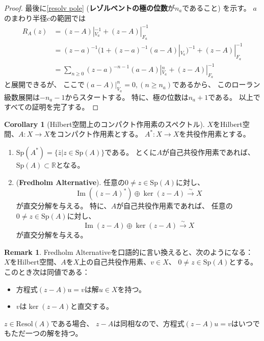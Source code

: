\documentclass[uplatex]{jsarticle}
\theoremstyle{definition}
\newtheorem{cor}[cor]{Corollary}
\newtheorem{rem}[rem]{Remark}
\DeclareMathOperator{\im}{\mathrm{Im}}
\newcommand{\R}{\mathbb{R}}
\newcommand{\resol}{\mathrm{Resol}}
\newcommand{\spectm}{\mathrm{Sp}}
\begin{document}
\begin{proof}
  最後に\ref{resolv pole}
  (\textbf{レゾルベントの極の位数}が\(n_a\)であること) を示す。
  \(a\)のまわり半径\(c\)の範囲では
  \begin{align*}
    R_A(z) &= (z-A)|_{V_a}^{-1} + (z-A)|_{F_a}^{-1} \\
    &= (z-a)^{-1}(1+(z-a)^{-1}(a-A)|_{V_a})^{-1} + (z-A)|_{F_a}^{-1} \\
    &= \sum_{n\geq 0}(z-a)^{-n-1}(a-A)|_{V_a}^n + (z-A)|_{F_a}^{-1}
  \end{align*}
  と展開できるが、
  ここで\((a-A)|_{V_a}^n = 0, (n\geq n_a)\)であるから、
  このローラン級数展開は\(-n_a-1\)からスタートする。
  特に、極の位数は\(n_a+1\)である。
  以上ですべての証明を完了する。
\end{proof}



\begin{cor}[Hilbert空間上のコンパクト作用素のスペクトル]
  \label{Hilb cpt spectm}
  \(X\)をHilbert空間、\(A:X\to X\)をコンパクト作用素とする。
  \(A^*:X\to X\)を共役作用素とする。
  \begin{enumerate}
    \item \label{conj spectm}
    \(\spectm(A^*) = \{ \bar{z} | z\in \spectm(A)\}\)である。
    とくに\(A\)が自己共役作用素であれば、
    \(\spectm(A)\subset \R\)となる。
    \item \label{Fredholm alt}
    (\textbf{Fredholm Alternative}).
    任意の\(0\neq z\in \spectm(A)\)に対し、
    \[\im((z-A)^*)\oplus \ker(z-A)\xrightarrow{\sim} X\]
    が直交分解を与える。
    特に、\(A\)が自己共役作用素であれば、
    任意の\(0\neq z\in \spectm(A)\)に対し、
    \[\im(z-A)\oplus \ker(z-A)\xrightarrow{\sim} X\]
    が直交分解を与える。
  \end{enumerate}
\end{cor}


\begin{rem}
  Fredholm Alternativeを口語的に言い換えると、次のようになる：
  \(X\)をHilbert空間、\(A\)を\(X\)上の自己共役作用素、\(v\in X\)、
  \(0\neq z\in \spectm(A)\)とする。
  このとき次は同値である：
  \begin{itemize}
    \item 方程式\((z-A)u = v\)は解\(u\in X\)を持つ。
    \item \(v\)は\(\ker(z-A)\)と直交する。
  \end{itemize}
  \(z\in \resol(A)\)である場合、
  \(z-A\)は同相なので、方程式\((z-A)u = v\)はいつでもただ一つの解を持つ。
\end{rem}
\end{document}
